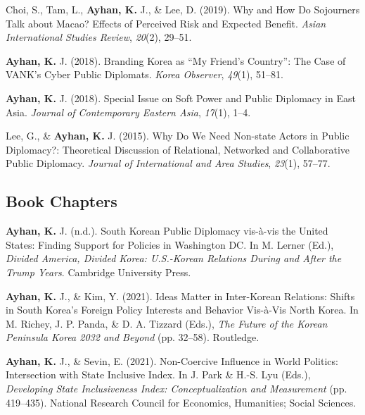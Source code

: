 \documentclass[11pt,a4paper,]{awesome-cv}
\begin{document}
\leavevmode{}%
Choi, S., Tam, L., \textbf{Ayhan, K.} J., \& Lee, D. (2019). Why and
{How} {Do} {Sojourners} {Talk} about {Macao}? {Effects} of {Perceived}
{Risk} and {Expected} {Benefit}. \emph{Asian International Studies
Review}, \emph{20}(2), 29--51.

\leavevmode{}%
\textbf{Ayhan, K.} J. (2018). Branding {Korea} as {``{My} {Friend}'s
{Country}''}: {The} {Case} of {VANK}'s {Cyber} {Public} {Diplomats}.
\emph{Korea Observer}, \emph{49}(1), 51--81.

\leavevmode{}%
\textbf{Ayhan, K.} J. (2018). Special {Issue} on {Soft} {Power} and
{Public} {Diplomacy} in {East} {Asia}. \emph{Journal of Contemporary
Eastern Asia}, \emph{17}(1), 1--4.

\leavevmode{}%
Lee, G., \& \textbf{Ayhan, K.} J. (2015). Why {Do} {We} {Need}
{Non}-state {Actors} in {Public} {Diplomacy}?: {Theoretical}
{Discussion} of {Relational}, {Networked} and {Collaborative} {Public}
{Diplomacy}. \emph{Journal of International and Area Studies},
\emph{23}(1), 57--77.

\hypertarget{book-chapters}{%
\subsection{Book Chapters}\label{book-chapters}}

\hypertarget{refs_section}{}
\leavevmode{}%
\textbf{Ayhan, K.} J. (n.d.). South {Korean} {Public} {Diplomacy}
vis-à-vis the {United} {States}: {Finding} {Support} for {Policies} in
{Washington} {DC}. In M. Lerner (Ed.), \emph{Divided {America},
{Divided} {Korea}: {U}.{S}.-{Korean} {Relations} {During} and {After}
the {Trump} {Years}}. Cambridge University Press.

\leavevmode{}%
\textbf{Ayhan, K.} J., \& Kim, Y. (2021). Ideas {Matter} in
{Inter}-{Korean} {Relations}: {Shifts} in {South} {Korea}'s {Foreign}
{Policy} {Interests} and {Behavior} {Vis}-à-{Vis} {North} {Korea}. In M.
Richey, J. P. Panda, \& D. A. Tizzard (Eds.), \emph{The {Future} of the
{Korean} {Peninsula} {Korea} 2032 and {Beyond}} (pp. 32--58). Routledge.

\leavevmode{}%
\textbf{Ayhan, K.} J., \& Sevin, E. (2021). Non-{Coercive} {Influence}
in {World} {Politics}: {Intersection} with {State} {Inclusive} {Index}.
In J. Park \& H.-S. Lyu (Eds.), \emph{Developing {State} {Inclusiveness}
{Index}: {Conceptualization} and {Measurement}} (pp. 419--435). National
Research Council for Economics, Humanities; Social Sciences.
\end{document}
